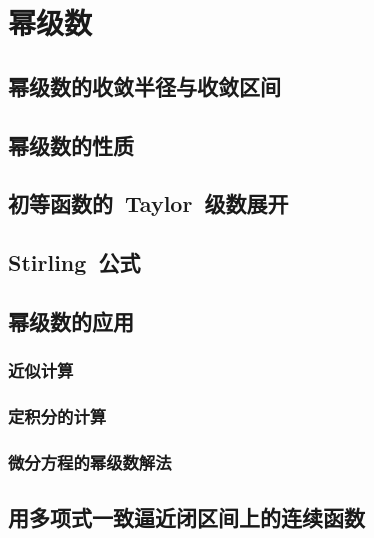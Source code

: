 

\chapter{幂级数}\label{ch:13}
\section{幂级数的收敛半径与收敛区间}
\begin{exercise}

\end{exercise}
\section{幂级数的性质}
\begin{exercise}

\end{exercise}
\section{初等函数的~Taylor~级数展开}
\begin{exercise}

\end{exercise}

\pushstar
\section{Stirling~公式}
\popstar

\begin{exercise}

\end{exercise}
\section{幂级数的应用}
\subsection{近似计算}
\subsection{定积分的计算}
\subsection{微分方程的幂级数解法}
\section{用多项式一致逼近闭区间上的连续函数}
\begin{exercise*}

\end{exercise*}




\endinput
